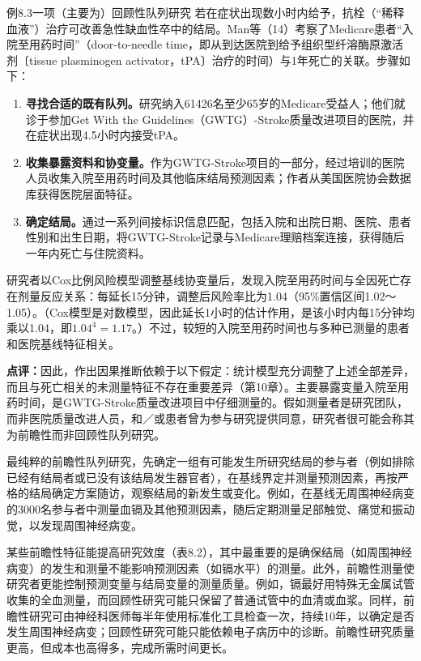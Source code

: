\begin{bookbox}{例8.3\quad 一项（主要为）回顾性队列研究}
若在症状出现数小时内给予，抗栓（“稀释血液”）治疗可改善急性缺血性卒中的结局。Man等（14）考察了Medicare患者“入院至用药时间”（door-to-needle time，即从到达医院到给予组织型纤溶酶原激活剂〔tissue plasminogen activator，tPA〕治疗的时间）与1年死亡的关联。步骤如下：
\begin{enumerate}
\item \textbf{寻找合适的既有队列。}研究纳入61426名至少65岁的Medicare受益人；他们就诊于参加Get With the Guidelines（GWTG）-Stroke质量改进项目的医院，并在症状出现4.5小时内接受tPA。
\item \textbf{收集暴露资料和协变量。}作为GWTG-Stroke项目的一部分，经过培训的医院人员收集入院至用药时间及其他临床结局预测因素；作者从美国医院协会数据库获得医院层面特征。
\item \textbf{确定结局。}通过一系列间接标识信息匹配，包括入院和出院日期、医院、患者性别和出生日期，将GWTG-Stroke记录与Medicare理赔档案连接，获得随后一年内死亡与住院资料。
\end{enumerate}
研究者以Cox比例风险模型调整基线协变量后，发现入院至用药时间与全因死亡存在剂量反应关系：每延长15分钟，调整后风险率比为1.04（95\%置信区间1.02～1.05）。（Cox模型是对数模型，因此延长1小时的估计作用，是该小时内每15分钟均乘以1.04，即$1.04^4=1.17$。）不过，较短的入院至用药时间也与多种已测量的患者和医院基线特征相关。

\textbf{点评：}因此，作出因果推断依赖于以下假定：统计模型充分调整了上述全部差异，而且与死亡相关的未测量特征不存在重要差异（第10章）。主要暴露变量入院至用药时间，是GWTG-Stroke质量改进项目中仔细测量的。假如测量者是研究团队，而非医院质量改进人员，和／或患者曾为参与研究提供同意，研究者很可能会称其为前瞻性而非回顾性队列研究。
\end{bookbox}

最纯粹的前瞻性队列研究，先确定一组有可能发生所研究结局的参与者（例如排除已经有结局者或已没有该结局发生器官者），在基线界定并测量预测因素，再按严格的结局确定方案随访，观察结局的新发生或变化。例如，在基线无周围神经病变的3000名参与者中测量血镉及其他预测因素，随后定期测量足部触觉、痛觉和振动觉，以发现周围神经病变。

某些前瞻性特征能提高研究效度（表8.2），其中最重要的是确保结局（如周围神经病变）的发生和测量不能影响预测因素（如镉水平）的测量。此外，前瞻性测量使研究者更能控制预测变量与结局变量的测量质量。例如，镉最好用特殊无金属试管收集的全血测量，而回顾性研究可能只保留了普通试管中的血清或血浆。同样，前瞻性研究可由神经科医师每半年使用标准化工具检查一次，持续10年，以确定是否发生周围神经病变；回顾性研究可能只能依赖电子病历中的诊断。前瞻性研究质量更高，但成本也高得多，完成所需时间更长。

